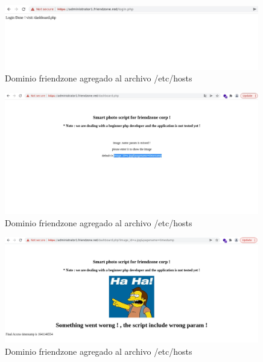         \begin{figure}[H]
            \centering
            \includegraphics[width=0.99\textwidth]{informe4/imagenes/friendzone/14_login.png}
            \caption{Dominio friendzone agregado al archivo /etc/hosts} 
        \end{figure}

        \begin{figure}[H]
            \centering
            \includegraphics[width=0.99\textwidth]{informe4/imagenes/friendzone/15_dashboard.png}
            \caption{Dominio friendzone agregado al archivo /etc/hosts} 
        \end{figure}

        \begin{figure}[H]
            \centering
            \includegraphics[width=0.99\textwidth]{informe4/imagenes/friendzone/16_dashboardimage.png}
            \caption{Dominio friendzone agregado al archivo /etc/hosts} 
        \end{figure}

